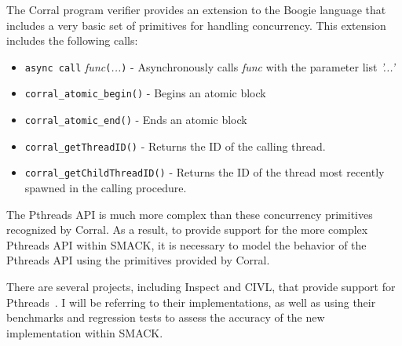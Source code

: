 The Corral program verifier provides an extension to the Boogie language that includes a very basic set of primitives for handling concurrency.  This extension includes the following calls:
\begin{itemize}
\item \lstinline|async call| \emph{func}\lstinline|(|\emph{...}\lstinline|)| - Asynchronously calls \emph{func} with the parameter list \emph{'...'}
\item \lstinline|corral_atomic_begin()| - Begins an atomic block
\item \lstinline|corral_atomic_end()| - Ends an atomic block
\item \lstinline|corral_getThreadID()| - Returns the ID of the calling thread.
\item \lstinline|corral_getChildThreadID()| - Returns the ID of the thread most recently spawned in the calling procedure.
\end{itemize}
The Pthreads API is much more complex than these concurrency primitives recognized by Corral.  As a result, to provide support for the more complex Pthreads API within SMACK, it is necessary to model the behavior of the Pthreads API using the primitives provided by Corral.

There are several projects, including Inspect and CIVL, that provide support for Pthreads~\cite{civl}\cite{inspect}.  I will be referring to their implementations, as well as using their benchmarks and regression tests to assess the accuracy of the new implementation within SMACK.
